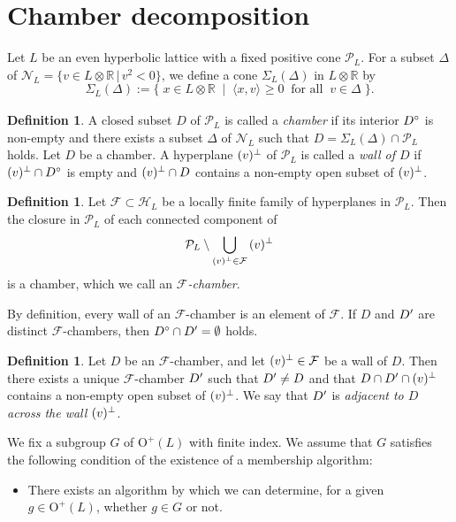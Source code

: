 \documentclass{amsart}
\theoremstyle{plain}
\theoremstyle{definition}
\newtheorem{definition}[theorem]{Definition}
\theoremstyle{remark}
\numberwithin{equation}{section}
\numberwithin{table}{section}
\numberwithin{figure}{section}
\newcommand{\R}{\mathord{\mathbb R}}
\newcommand{\FFF}{\mathord{\mathcal F}}
\newcommand{\HHH}{\mathord{\mathcal H}}
\newcommand{\NNN}{\mathord{\mathcal N}}
\newcommand{\PPP}{\mathord{\mathcal P}}
\newcommand{\set}[2]{\{\; {#1} \; \mid \; {#2} \;  \}}
\newcommand{\shortset}[2]{\{ {#1} \,|\, {#2}   \}}
\newcommand{\tensor}{\otimes}
\newcommand{\sprime}{\sp\prime}
\newcommand{\spcirc}{\sp{\mathord{\circ}}}
\newcommand{\sperp}{\sp{\perp}}
\newcommand{\OG}{\mathord{\mathrm {O}}}
\newcommand{\intM}[2]{\langle{#1}\rangle_{#2}}
\newcommand{\clPPP}{\overline{\PPP}}
\newcommand{\clD}{\overline{D}}
\newcommand{\propVG}{\mathord{\rm [G]}}
\begin{document}
\section{Chamber decomposition}\label{sec:chamber}
%
%
Let $L$ be an even hyperbolic lattice
with a fixed positive cone $\PPP_L$.
For a subset $\Delta$ of $\NNN_L=\shortset{v\in L\tensor\R}{v^2<0}$, 
we define a cone $\Sigma_L(\Delta)$ in $L\tensor \R$ by 
%
\begin{equation}\label{eq:Sigma}
\Sigma_L(\Delta):=\set{x\in L\tensor \R}{\intM{x, v}{}\ge 0\;\;\textrm{for all}\;\; v\in \Delta}.
\end{equation}
%
\begin{definition}\label{def:chamber}
A closed subset $D$ of $\PPP_L$ is called a \emph{chamber}
if its interior $D\spcirc$ is non-empty and
there exists a subset $\Delta$ of $\NNN_L$  such that $D=\Sigma_L(\Delta)\cap \PPP_L$ holds.
Let $D$ be a chamber.
A hyperplane $(v)\sperp$ of $\PPP_L$ %
is called a \emph{wall of $D$} if $(v)\sperp\cap D\spcirc$ is empty
and $(v)\sperp\cap D$ contains a non-empty open subset of $(v)\sperp$.
 \end{definition}
 \begin{definition}
 Let $\FFF\subset\HHH_L$ be a locally finite family of hyperplanes in $\PPP_L$.
 Then  the closure in $\PPP_L$ of each connected component of
$$
\PPP_L\setminus \bigcup_{(v)\sperp \in \FFF}\, (v)\sperp
$$ 
is a chamber,
which we call an \emph{$\FFF$-chamber}.
\end{definition}
%
By definition, 
every wall of an $\FFF$-chamber is an element of $\FFF$.
If $D$ and $D\sprime$ are distinct $\FFF$-chambers, then $D\spcirc \cap D\sprime=\emptyset$ holds.
%
 \begin{definition}
Let $D$ be an $\FFF$-chamber,  and let $(v)\sperp\in \FFF$ be a wall of $D$.
Then there exists a unique $\FFF$-chamber $D\sprime$
such that $D\sprime\ne D$ and that 
$D\cap D\sprime\cap (v)\sperp$ contains a non-empty open subset of $(v)\sperp$.
We say that  $D\sprime$ is  \emph{adjacent to $D$ across the wall $(v)\sperp$}.
\end{definition}
%
We fix a subgroup $G$ of $\OG^+(L)$ with finite index.
We assume  that $G$ satisfies the following condition of the existence of a membership algorithm:
%
%
\begin{itemize}
\item[$\propVG$]
There exists an algorithm by which we can determine,
for a given $g\in \OG^+(L)$,   whether $g\in G$ or not.
\end{itemize}
\end{document}
